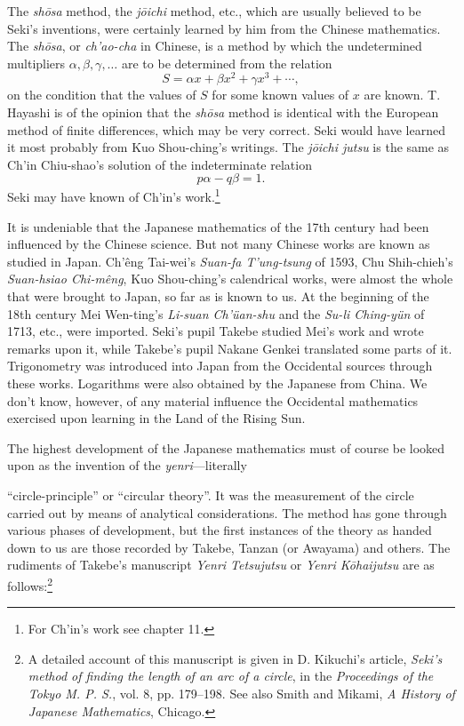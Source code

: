 \documentclass[11pt]{article}
\newcommand{\scanpage}[2]{\clearpage\setcounter{footnote}{0}\noindent{\footnotesize\color{gray}PDF page #1 · #2}\par\medskip}
\newcommand{\scanfooter}{}
\begin{document}
The \emph{shōsa} method, the \emph{jōichi} method, etc., which are usually believed to be Seki's inventions, were certainly learned by him from the Chinese mathematics. The \emph{shōsa}, or \emph{ch'ao-cha} in Chinese, is a method by which the undetermined multipliers $\alpha,\beta,\gamma,\ldots$ are to be determined from the relation
\[
S=\alpha x+\beta x^2+\gamma x^3+\cdots,
\]
on the condition that the values of $S$ for some known values of $x$ are known. T. Hayashi is of the opinion that the \emph{shōsa} method is identical with the European method of finite differences, which may be very correct. Seki would have learned it most probably from Kuo Shou-ching's writings. The \emph{jōichi jutsu} is the same as Ch'in Chiu-shao's solution of the indeterminate relation
\[
p\alpha-q\beta=1.
\]
Seki may have known of Ch'in's work.\footnote{For Ch'in's work see chapter 11.}

It is undeniable that the Japanese mathematics of the 17th century had been influenced by the Chinese science. But not many Chinese works are known as studied in Japan. Ch'êng Tai-wei's \emph{Suan-fa T'ung-tsung} of 1593, Chu Shih-chieh's \emph{Suan-hsiao Chi-mêng}, Kuo Shou-ching's calendrical works, were almost the whole that were brought to Japan, so far as is known to us. At the beginning of the 18th century Mei Wen-ting's \emph{Li-suan Ch'üan-shu} and the \emph{Su-li Ching-yün} of 1713, etc., were imported. Seki's pupil Takebe studied Mei's work and wrote remarks upon it, while Takebe's pupil Nakane Genkei translated some parts of it. Trigonometry was introduced into Japan from the Occidental sources through these works. Logarithms were also obtained by the Japanese from China. We don't know, however, of any material influence the Occidental mathematics exercised upon learning in the Land of the Rising Sun.

The highest development of the Japanese mathematics must of course be looked upon as the invention of the \emph{yenri}---literally
\scanfooter

\scanpage{0178}{Chapter 22, printed page 164}
``circle-principle'' or ``circular theory''. It was the measurement of the circle carried out by means of analytical considerations. The method has gone through various phases of development, but the first instances of the theory as handed down to us are those recorded by Takebe, Tanzan (or Awayama) and others. The rudiments of Takebe's manuscript \emph{Yenri Tetsujutsu} or \emph{Yenri Kōhaijutsu} are as follows:\footnote{A detailed account of this manuscript is given in D. Kikuchi's article, \emph{Seki's method of finding the length of an arc of a circle}, in the \emph{Proceedings of the Tokyo M. P. S.}, vol. 8, pp. 179--198. See also Smith and Mikami, \emph{A History of Japanese Mathematics}, Chicago.}
\end{document}
